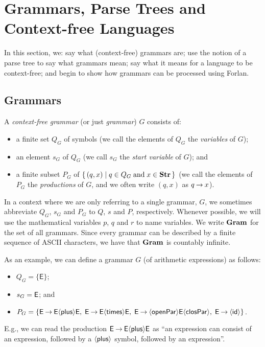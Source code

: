 \section{Grammars, Parse Trees and Context-free Languages}
\label{GrammarsParseTreesAndContextFreeLanguages}

In this section, we: say what (context-free) grammars are; use the
notion of a parse tree to say what grammars mean; say what it means
for a language to be context-free; and begin to show how grammars can
be processed using Forlan.

\subsection{Grammars}

A \emph{context-free grammar} (or just \emph{grammar}) $G$ consists of:
\begin{itemize}
\item a finite set $Q_G$ of symbols (we call the elements of $Q_G$
the \emph{variables} of $G$);

\item an element $s_G$ of $Q_G$ (we call $s_G$ the \emph{start variable}
of $G$); and

\item a finite subset $P_G$ of $\{ \, (q,x) \mid q\in Q_G\;\allowbreak\mbox{and}\allowbreak\;
x\in\mathbf{Str} \, \}$ (we call the elements of $P_G$ the \emph{productions} of
$G$, and we often write $(q, x)$ as $q\mathbin{\to} x$).
\end{itemize}

In a context where we are only referring to a single grammar, $G$, we
sometimes abbreviate $Q_G$, $s_G$ and $P_G$ to $Q$, $s$ and $P$,
respectively.  Whenever possible, we will use the mathematical
variables $p$, $q$ and $r$ to name variables.  We write $\mathbf{Gram}$ for
the set of all grammars.  Since every grammar can be described by a
finite sequence of ASCII characters, we have that $\mathbf{Gram}$ is countably
infinite.

As an example, we can define a grammar $G$ (of arithmetic expressions) as
follows:
\begin{itemize}
\item $Q_G=\{\mathsf{E}\}$;

\item $s_G=\mathsf{E}$; and

\item $P_G=\{\mathsf{E\mathbin{\to} E{\langle\mathsf{plus}\rangle} E,\;
E\mathbin{\to} E{\langle\mathsf{times}\rangle} E,\;
E\mathbin{\to}{\langle\mathsf{openPar}\rangle} E{\langle\mathsf{closPar}\rangle},\;
E\mathbin{\to}{\langle\mathsf{id}\rangle}}\}$.
\end{itemize}
E.g., we can read the production $\mathsf{E}\mathbin{\to}\mathsf{E}{\langle\mathsf{plus}\rangle}\mathsf{E}$
as ``an expression can consist of an expression, followed by
a ${\langle\mathsf{plus}\rangle}$ symbol, followed by an expression''.

